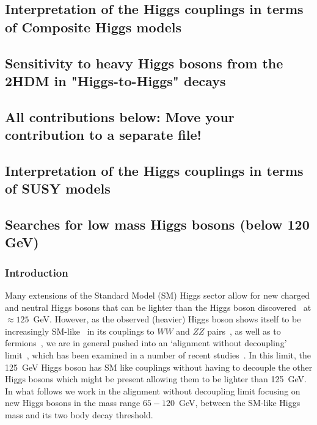 \documentclass[../report.tex]{subfiles}
\providecommand{\main}{..}
\begin{document}
\subsection{Interpretation of the Higgs couplings in terms of Composite Higgs models}


\subsection{Sensitivity to heavy Higgs bosons from the 2HDM in "Higgs-to-Higgs" decays}


\vspace{5cm}
\subsection{All contributions below: Move your contribution to a separate file!}

\clearpage

\subsection{Interpretation of the Higgs couplings in terms of SUSY models}




\subsection{Searches for low mass Higgs bosons (below 120 GeV)}


\subsubsection{Introduction}\label{sec:intro}

Many extensions of the Standard Model (SM) Higgs sector allow for new
charged and neutral Higgs bosons that can be lighter than the Higgs
boson discovered~\cite{Aad:2012tfa,Chatrchyan:2012xdj} at $\approx 125$~GeV. 
However, as the observed (heavier) Higgs boson shows itself to be 
increasingly SM-like~\cite{Falkowski:2013dza} in its couplings to $WW$
and $ZZ$ pairs~\cite{Khachatryan:2014kca,Khachatryan:2016vau,Sirunyan:2017exp,Sirunyan:2017tqd,Aaboud:2017oem,Falkowski:2013dza},
as well as to fermions~\cite{Aaboud:2018zhk,CMS:2018abb}, we are in
general pushed into an `alignment without decoupling'
limit~\cite{Gunion:2002zf,Carena:2013ooa}, which has been examined in a
number of recent
studies~\cite{Craig:2013hca,Carena:2014nza,Carena:2015moc,Bernon:2015wef,Profumo:2016zxo,Bechtle:2016kui,Haber:2017erd,Bahl:2018zmf}. In
this limit, the 125~GeV Higgs boson has SM like couplings without having
to decouple the other Higgs bosons which might be present allowing them
to be lighter than 125~GeV. In what follows we work in the alignment
without decoupling limit focusing on new Higgs bosons in the mass range
$65 - 120$~GeV, between the SM-like Higgs mass and its two body decay
threshold. 
\end{document}
